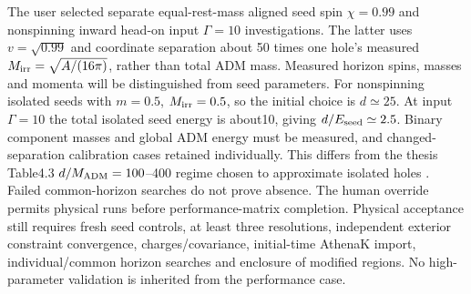\documentclass[11pt]{article}
\begin{document}
The user selected separate equal-rest-mass aligned seed spin $\chi=0.99$ and
nonspinning inward head-on input $\Gamma=10$ investigations. The latter uses
$v=\sqrt{0.99}$ and coordinate separation about 50 times one hole's measured
$M_{\rm irr}=\sqrt{A/(16\pi)}$, rather than total ADM mass. Measured horizon
spins, masses and momenta will be distinguished from seed parameters.
For nonspinning isolated seeds with $m=0.5$, $M_{\rm irr}=0.5$, so the
initial choice is $d\simeq25$. At input $\Gamma=10$ the total isolated seed
energy is about10, giving $d/E_{\rm seed}\simeq2.5$. Binary component masses
and global ADM energy must be measured, and changed-separation calibration
cases retained individually. This differs from the thesis Table4.3
$d/M_{\rm ADM}=100$--400 regime chosen to approximate isolated holes
\cite{thesis}. Failed common-horizon searches do not prove absence.
The human override permits physical runs before performance-matrix completion.
Physical acceptance still requires
fresh seed controls, at least three resolutions, independent exterior
constraint convergence, charges/covariance, initial-time AthenaK import,
individual/common horizon searches and enclosure of modified regions.
No high-parameter validation is inherited from the performance case.
\end{document}
